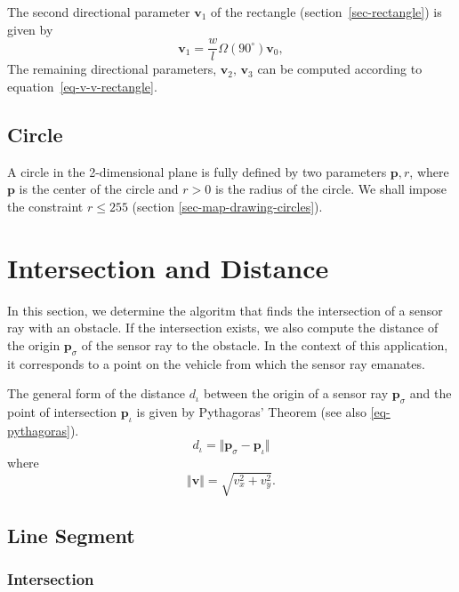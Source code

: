 \documentclass[11pt]{article}
\newcommand{\diota}{d_\iota}
\newcommand{\pb}{\mathbf{p}}
\newcommand{\pbiot}{\mathbf{p}_\iota}
\newcommand{\pbsig}{\mathbf{p}_\sigma}
\newcommand{\vb}{\mathbf{v}}
\begin{document}
The second directional parameter $\vb_1$ of the rectangle
(section~\ref{sec-rectangle}) is given by
\begin{equation}
    \vb_1 = \frac{w}{l}\Omega(90^\circ)\vb_0,
    \label{eq-vb1-rectangle}
\end{equation}
The remaining directional parameters, $\vb_2,\,\vb_3$ can be computed according
to equation~\eqref{eq-v-v-rectangle}.

\subsection{Circle}

A circle in the 2-dimensional plane is fully defined by two parameters
$\pb, r$, where $\pb$ is the center of the circle and $r>0$ is the
radius of the circle. We shall impose the constraint $r\leq 255$ (section
\ref{sec-map-drawing-circles}).


\section{Intersection and Distance}
\label{sec-intersection-distance}

In this section, we determine the algoritm that finds the intersection of a
sensor ray  with an obstacle. If the intersection
exists, we also compute the distance of the origin $\pbsig$ of the
sensor ray to the obstacle. In the context of this application, it
corresponds to a point on the vehicle from which the sensor ray emanates.

The general form of the distance $\diota$ between the origin of a sensor ray
$\pbsig$ and the point of intersection $\pbiot$ is given by
Pythagoras' Theorem (see also \eqref{eq-pythagoras}).
\begin{equation}
    \diota = \Vert\pbsig-\pbiot\Vert
\end{equation}
where
\begin{equation}
    \Vert\vb\Vert = \sqrt{v_{x}^2 + v_{y}^2}.\label{eq-pythagoras}
\end{equation}

\subsection{Line Segment}
\label{sec-intersection-line-segment}

\subsubsection*{Intersection}
\end{document}
